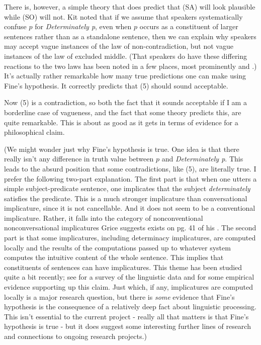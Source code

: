 There is, however, a simple theory that does predict that (SA) will look plausible while (SO) will not. Kit \citet{Fine1975a} noted that if we assume that speakers systematically confuse \(p\) for \textit{Determinately p}, even when \(p\) occurs as a constituent of larger sentences rather than as a standalone sentence, then we can explain why speakers may accept vague instances of the law of non-contradiction, but not vague instances of the law of excluded middle. (That speakers do have these differing reactions to the two laws has been noted in a few places, most prominently \citet{Burgess1987} and \citet{Tappenden1993}.) It's actually rather remarkable how many true predictions one can make using Fine's hypothesis. It correctly predicts that (5) should sound acceptable. 


\noindent Now (5) is a contradiction, so both the fact that it sounds acceptable if I am a borderline case of vagueness, and the fact that some theory predicts this, are quite remarkable. This is about as good as it gets in terms of evidence for a philosophical claim.

(We might wonder just why Fine's hypothesis is true. One idea is that there really isn't any difference in truth value between \(p\) and \textit{Determinately p}. This leads to the absurd position that some contradictions, like (5), are literally true. I prefer the following two-part explanation. The first part is that when one utters a simple subject-predicate sentence, one implicates that the subject \textit{determinately} satisfies the predicate. This is a much stronger implicature than conversational implicature, since it is not cancellable. And it does not seem to be a conventional implicature. Rather, it falls into the category of nonconventional nonconversational implicatures Grice suggests exists on pg. 41 of his \citeyear{Grice1989}. The second part is that some implicatures, including determinacy implicatures, are computed locally and the results of the computations passed up to whatever system computes the intuitive content of the whole sentence. This implies that constituents of sentences can have implicatures. This theme has been studied quite a bit recently; see \citet{Levinson2000} for a survey of the linguistic data and \citet{Sedivy1999} for some empirical evidence supporting up this claim. Just which, if any, implicatures are computed locally is a major research question, but there is \textit{some }evidence that Fine's hypothesis is the consequence of a relatively deep fact about linguistic processing. This isn't essential to the current project - really all that matters is that Fine's hypothesis is true - but it does suggest some interesting further lines of research and connections to ongoing research projects.)

